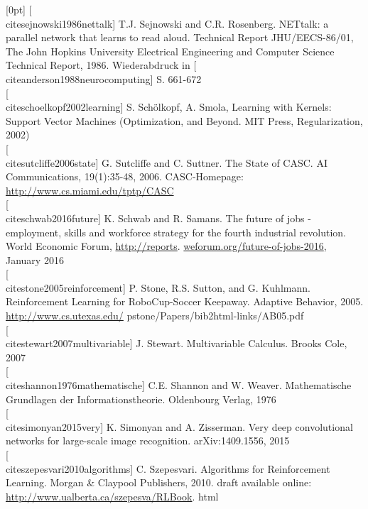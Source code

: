 \documentclass[10pt]{book}
\begin{document}
[0pt]
[\\cite{sejnowski1986nettalk}] T.J. Sejnowski and C.R. Rosenberg. NETtalk: a parallel network that learns to read aloud. Technical Report JHU/EECS-86/01, The John Hopkins University Electrical Engineering and Computer Science Technical Report, 1986. Wiederabdruck in [\\cite{anderson1988neurocomputing}] S. 661-672\\[0pt]
[\\cite{schoelkopf2002learning}] S. Schölkopf, A. Smola, Learning with Kernels: Support Vector Machines (Optimization, and Beyond. MIT Press, Regularization, 2002)\\[0pt]
[\\cite{sutcliffe2006state}] G. Sutcliffe and C. Suttner. The State of CASC. AI Communications, 19(1):35-48, 2006. CASC-Homepage: \href{http://www.cs.miami.edu/tptp/CASC}{http://www.cs.miami.edu/tptp/CASC}\\[0pt]
[\\cite{schwab2016future}] K. Schwab and R. Samans. The future of jobs - employment, skills and workforce strategy for the fourth industrial revolution. World Economic Forum, \href{http://reports}{http://reports}. \href{http://weforum.org/future-of-jobs-2016}{weforum.org/future-of-jobs-2016}, January 2016\\[0pt]
[\\cite{stone2005reinforcement}] P. Stone, R.S. Sutton, and G. Kuhlmann. Reinforcement Learning for RoboCup-Soccer Keepaway. Adaptive Behavior, 2005. \href{http://www.cs.utexas.edu/}{http://www.cs.utexas.edu/} pstone/Papers/bib2html-links/AB05.pdf\\[0pt]
[\\cite{stewart2007multivariable}] J. Stewart. Multivariable Calculus. Brooks Cole, 2007\\[0pt]
[\\cite{shannon1976mathematische}] C.E. Shannon and W. Weaver. Mathematische Grundlagen der Informationstheorie. Oldenbourg Verlag, 1976\\[0pt]
[\\cite{simonyan2015very}] K. Simonyan and A. Zisserman. Very deep convolutional networks for large-scale image recognition. arXiv:1409.1556, 2015\\[0pt]
[\\cite{szepesvari2010algorithms}] C. Szepesvari. Algorithms for Reinforcement Learning. Morgan \& Claypool Publishers, 2010. draft available online: \href{http://www.ualberta.ca/szepesva/RLBook}{http://www.ualberta.ca/szepesva/RLBook}. html\\[0pt]
\end{document}
